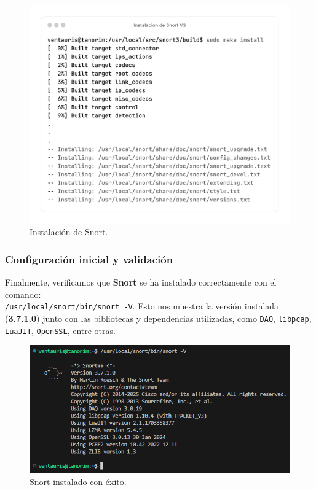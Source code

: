 \documentclass[11pt,a4paper,twoside]{report}
\begin{document}
\begin{figure}[H]
	\centering
	\includegraphics[scale=0.12]{instalacion_snort/23-23.png}
	\caption{Instalación de Snort.}
\end{figure}

\subsubsection*{Configuración inicial y validación}

Finalmente, verificamos que \textbf{Snort} se ha instalado correctamente con el comando: \\
\texttt{/usr/local/snort/bin/snort -V}. Esto nos muestra la versión instalada (\textbf{3.7.1.0}) junto con las bibliotecas y dependencias utilizadas, como \texttt{DAQ}, \texttt{libpcap}, \texttt{LuaJIT}, \texttt{OpenSSL}, entre otras.

\begin{figure}[H]
	\centering
	\includegraphics[scale=0.7]{instalacion_snort/24.png}
	\caption{Snort instalado con éxito.}
\end{figure}
\end{document}
